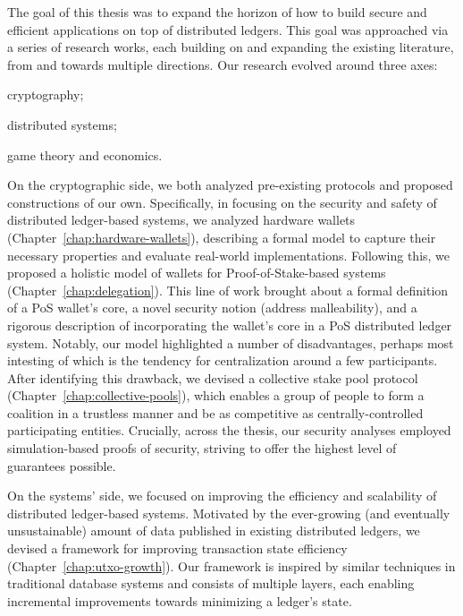 The goal of this thesis was to expand the horizon of how to build secure and
efficient applications on top of distributed ledgers. This goal was approached
via a series of research works, each building on and expanding the existing
literature, from and towards multiple directions. Our research evolved
around three axes:
\begin{inparaenum}[i)]
    \item cryptography;
    \item distributed systems;
    \item game theory and economics.
\end{inparaenum}

On the cryptographic side, we both analyzed pre-existing protocols and proposed
constructions of our own. Specifically, in focusing on the security and safety
of distributed ledger-based systems, we analyzed hardware wallets
(Chapter~\ref{chap:hardware-wallets}), describing a formal model to capture
their necessary properties and evaluate real-world implementations. Following
this, we proposed a holistic model of wallets for Proof-of-Stake-based systems
(Chapter~\ref{chap:delegation}). This line of work brought about a formal
definition of a PoS wallet's core, a novel security notion (address
malleability), and a rigorous description of incorporating the wallet's core in
a PoS distributed ledger system. Notably, our model highlighted a number
of disadvantages, perhaps most intesting of which is the tendency for
centralization around a few participants. After identifying this drawback, we
devised a collective stake pool protocol (Chapter~\ref{chap:collective-pools}),
which enables a group of people to form a coalition in a trustless manner
and be as competitive as centrally-controlled participating entities.
Crucially, across the thesis, our security analyses employed simulation-based
proofs of security, striving to offer the highest level of guarantees possible.

On the systems' side, we focused on improving the efficiency and scalability of
distributed ledger-based systems. Motivated by the ever-growing (and eventually
unsustainable) amount of data published in existing distributed ledgers, we
devised a framework for improving transaction state efficiency
(Chapter~\ref{chap:utxo-growth}). Our framework is inspired by similar
techniques in traditional database systems and consists of multiple layers,
each enabling incremental improvements towards minimizing a ledger's state.

